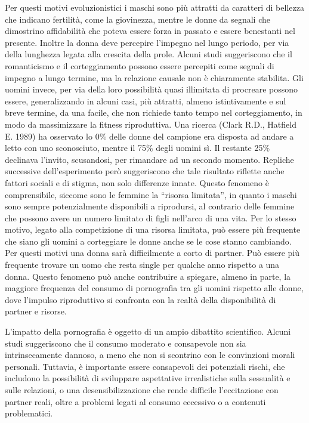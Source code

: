 \documentclass[12pt]{book} %
\begin{document}
Per questi motivi evoluzionistici i maschi sono più attratti da caratteri di bellezza che indicano fertilità, come la giovinezza, mentre le
donne da segnali che dimostrino affidabilità che poteva essere forza in passato e essere benestanti nel presente.
Inoltre la donna deve percepire l'impegno nel lungo periodo, per via della lunghezza legata
alla crescita della prole. Alcuni studi suggeriscono che il romanticismo e il corteggiamento possono essere percepiti come segnali di impegno a lungo termine, ma la relazione causale non è chiaramente stabilita. Gli uomini invece, per via della loro possibilità quasi
illimitata di procreare possono essere, generalizzando in alcuni casi, più attratti, almeno istintivamente e sul breve termine, da una facile, che non richiede tanto tempo nel corteggiamento, in modo da massimizzare la fitness riproduttiva. Una ricerca (Clark R.D., Hatfield E.
1989) ha osservato lo 0\% delle donne del campione era disposta ad andare a letto con uno sconosciuto, mentre il 75\%
degli uomini sì. Il restante 25\% declinava l'invito, scusandosi, per rimandare ad un secondo
momento. Repliche successive dell'esperimento però suggeriscono che tale risultato riflette anche fattori sociali e di stigma, non solo differenze innate. Questo fenomeno è comprensibile, siccome sono le femmine la “risorsa limitata”, in quanto i maschi sono sempre
potenzialmente disponibili a riprodursi, al contrario delle femmine che possono avere un numero limitato di figli
nell'arco di una vita. Per lo stesso motivo, legato alla competizione di una risorsa limitata, può essere più frequente che siano gli uomini a corteggiare le donne anche se le cose stanno cambiando. Per questi motivi
una donna sarà difficilmente a corto di partner. Può essere più frequente trovare un uomo
che resta single per qualche anno rispetto a una donna. Questo fenomeno può anche contribuire a spiegare, almeno in parte, la maggiore frequenza del consumo di pornografia tra gli uomini rispetto alle donne, dove l'impulso riproduttivo si confronta con la realtà della disponibilità di partner e risorse.

\begin{mdframed}[linewidth=1pt]
L'impatto della pornografia è oggetto di un ampio dibattito scientifico. Alcuni studi suggeriscono che il consumo moderato e consapevole non sia intrinsecamente dannoso, a meno che non si scontrino con le convinzioni morali personali. Tuttavia, è importante essere consapevoli dei potenziali rischi, che includono la possibilità di sviluppare aspettative irrealistiche sulla sessualità e sulle relazioni, o una desensibilizzazione che rende difficile l'eccitazione con partner reali, oltre a problemi legati al consumo eccessivo o a contenuti problematici.
\end{mdframed}
\end{document}
